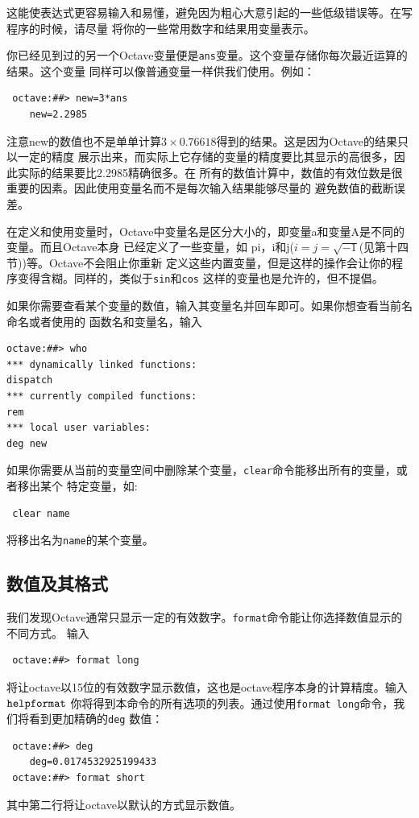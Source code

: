 \documentclass[UTF8,adobefonts]{ctexart}
\begin{document}
这能使表达式更容易输入和易懂，避免因为粗心大意引起的一些低级错误等。在写程序的时候，请尽量
将你的一些常用数字和结果用变量表示。

你已经见到过的另一个Octave变量便是{\tt ans}变量。这个变量存储你每次最近运算的结果。这个变量
同样可以像普通变量一样供我们使用。例如：
\begin{verbatim}
 octave:##> new=3*ans
    new=2.2985
\end{verbatim}
注意new的数值也不是单单计算$3\times0.76618$得到的结果。这是因为Octave的结果只以一定的精度
展示出来，而实际上它存储的变量的精度要比其显示的高很多，因此实际的结果要比2.2985精确很多。在
所有的数值计算中，数值的有效位数是很重要的因素。因此使用变量名而不是每次输入结果能够尽量的
避免数值的截断误差。

在定义和使用变量时，Octave中变量名是区分大小的，即变量a和变量A是不同的变量。而且Octave本身
已经定义了一些变量，如 pi，i和j($i=j=\sqrt{-1}$(见第十四节))等。Octave不会阻止你重新
定义这些内置变量，但是这样的操作会让你的程序变得含糊。同样的，类似于{\tt sin}和{\tt cos}
这样的变量也是允许的，但不提倡。

如果你需要查看某个变量的数值，输入其变量名并回车即可。如果你想查看当前名命名或者使用的
函数名和变量名，输入
\begin{verbatim}
octave:##> who
*** dynamically linked functions:
dispatch
*** currently compiled functions:
rem
*** local user variables:
deg new
\end{verbatim}

如果你需要从当前的变量空间中删除某个变量，{\tt clear}命令能移出所有的变量，或者移出某个
特定变量，如:
\begin{verbatim}
 clear name
\end{verbatim}
将移出名为{\tt name}的某个变量。
\subsection{数值及其格式}
我们发现Octave通常只显示一定的有效数字。{\tt format}命令能让你选择数值显示的不同方式。
输入
\begin{verbatim}
 octave:##> format long
\end{verbatim}
将让octave以15位的有效数字显示数值，这也是octave程序本身的计算精度。输入$\tt help format$
你将得到本命令的所有选项的列表。通过使用{\tt format long}命令，我们将看到更加精确的{\tt deg}
数值：
\begin{verbatim}
 octave:##> deg
    deg=0.0174532925199433
 octave:##> format short
\end{verbatim}
其中第二行将让octave以默认的方式显示数值。
\end{document}
